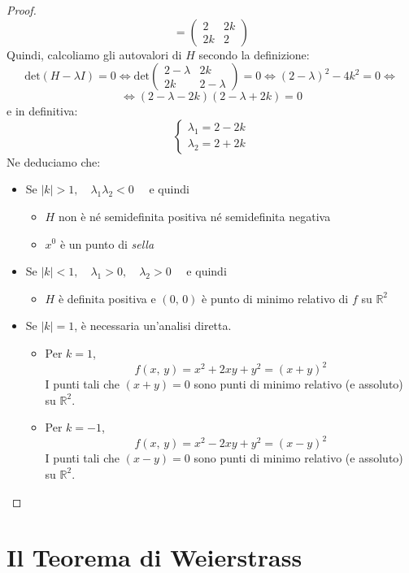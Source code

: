 \begin{proof}
$$=
\left(
\begin{array}{cc}
2 & 2k\\
2k & 2
\end{array}
\right)
$$
Quindi, calcoliamo gli autovalori di $H$ secondo la definizione:
$$
\mathrm{det}(H-\lambda I)=0
\Longleftrightarrow
\mathrm{det} \left(
\begin{array}{cc}
2-\lambda & 2k\\
2k & 2-\lambda
\end{array}
\right)=0
\Longleftrightarrow
(2-\lambda)^2-4k^2 = 0
\Longleftrightarrow
$$
$$
\Longleftrightarrow
(2-\lambda-2k)(2-\lambda+2k)=0
$$
e in definitiva:
$$
\begin{cases}
\lambda_{1} = 2-2k\\
\lambda_{2} = 2+2k
\end{cases}
$$
Ne deduciamo che:
\begin{itemize}
\item Se $|k|>1, \quad \lambda_{1}\lambda_{2} < 0 \quad$ e quindi
	\begin{itemize}
	\item $H$ non è né semidefinita positiva né semidefinita negativa
	\item $x^0$ è un punto di \emph{sella}
	\end{itemize}
\item Se $|k|<1, \quad \lambda_{1}>0, \quad \lambda_{2}>0 \quad$ e quindi
	\begin{itemize}
	\item $H$ è definita positiva e $(0,\,0)$ è punto di minimo relativo di $f$ su $\mathbb{R}^2$
	\end{itemize}
\item Se $|k|=1$, è necessaria un'analisi diretta.
	\begin{itemize}
	\item Per \underline{$k=1$},
	$$
	f(x,\,y) = x^2+2xy+y^2 = (x+y)^2
	$$
	I punti tali che $(x+y)=0$ sono punti di minimo relativo (e assoluto) su $\mathbb{R}^2$.
	\item Per \underline{$k=-1$},
	$$
	f(x,\,y) = x^2-2xy+y^2 = (x-y)^2
	$$
	I punti tali che $(x-y)=0$ sono punti di minimo relativo (e assoluto) su $\mathbb{R}^2$.
	\end{itemize}
\end{itemize}
\end{proof}

\section{Il Teorema di Weierstrass}

